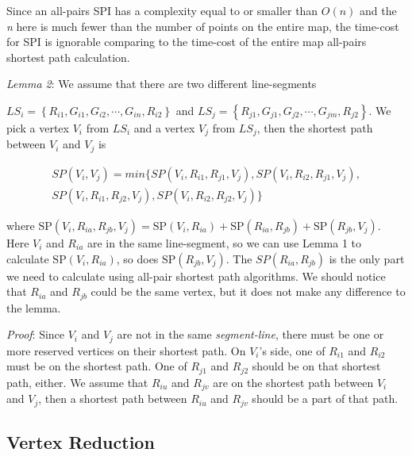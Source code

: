 Since an all-pairs SPI has a complexity equal to or smaller than $O\left(n\right)$ and the \textit{n} here is much fewer than the number of points on the entire map, the time-cost for SPI is ignorable comparing to the time-cost of the entire map all-pairs shortest path calculation.

\textit{Lemma 2}: We assume that there are two different line-segments 

\noindent ${LS}_i=\left\{R_{i1},G_{i1},G_{i2},\cdots,G_{in},R_{i2}\right\}$ and ${LS}_j=\left\{R_{j1},G_{j1},G_{j2},\cdots,G_{jm},R_{j2}\right\}$. We pick a vertex $V_i$ from $LS_i$ and a vertex $V_j$ from $LS_j$, then the shortest path between $V_i$ and $V_j$ is 

\begin{equation} \label{GrindEQ__VRShortestOutside} 
\begin{split}
SP\left(V_i,V_j\right)=min\{SP\left(V_i,R_{i1},R_{j1},V_j\right),SP\left(V_i,R_{i2},R_{j1},V_j\right), \\
SP\left(V_i,R_{i1},R_{j2},V_j\right),SP\left(V_i,R_{i2},R_{j2},V_j\right)\}
\end{split}
\end{equation}

where $\mathrm{SP}\left(V_i,R_{ia},R_{jb},V_j\right)=\mathrm{SP}\left(V_i,R_{ia}\right)+\mathrm{SP}\left(R_{ia},R_{jb}\right)+\mathrm{SP}\left(R_{jb},V_j\right)$. Here $V_i$ and $R_{ia}$ are in the same line-segment, so we can use Lemma 1 to calculate $\mathrm{SP}\left(V_i,R_{ia}\right)$, so does $\mathrm{SP}\left(R_{jb},V_j\right)$. The $SP\left(R_{ia},R_{jb}\right)$ is the only part we need to calculate using all-pair shortest path algorithms. We should notice that $R_{ia}$ and $R_{jb}$ could be the same vertex, but it does not make any difference to the lemma.

\textit{Proof}: Since $V_i$ and $V_j$ are not in the same \textit{segment-line}, there must be one or more reserved vertices on their shortest path. On $V_i$'s side, one of $R_{i1}$ and $R_{i2}$ must be on the shortest path. One of $R_{j1}$ and $R_{j2}$ should be on that shortest path, either. We assume that $R_{iu}$ and $R_{jv}$ are on the shortest path between $V_i$ and $V_j$, then a shortest path between $R_{iu}$ and $R_{jv}$ should be a part of that path.


\subsection{ Vertex Reduction}\label{subsecVR}

